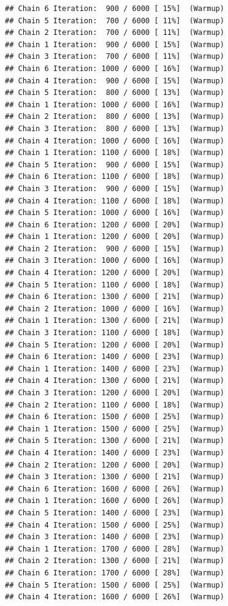 \documentclass[
]{article}
\begin{document}
\begin{verbatim}
## Chain 6 Iteration:  900 / 6000 [ 15%]  (Warmup) 
## Chain 5 Iteration:  700 / 6000 [ 11%]  (Warmup) 
## Chain 2 Iteration:  700 / 6000 [ 11%]  (Warmup) 
## Chain 1 Iteration:  900 / 6000 [ 15%]  (Warmup) 
## Chain 3 Iteration:  700 / 6000 [ 11%]  (Warmup) 
## Chain 6 Iteration: 1000 / 6000 [ 16%]  (Warmup) 
## Chain 4 Iteration:  900 / 6000 [ 15%]  (Warmup) 
## Chain 5 Iteration:  800 / 6000 [ 13%]  (Warmup) 
## Chain 1 Iteration: 1000 / 6000 [ 16%]  (Warmup) 
## Chain 2 Iteration:  800 / 6000 [ 13%]  (Warmup) 
## Chain 3 Iteration:  800 / 6000 [ 13%]  (Warmup) 
## Chain 4 Iteration: 1000 / 6000 [ 16%]  (Warmup) 
## Chain 1 Iteration: 1100 / 6000 [ 18%]  (Warmup) 
## Chain 5 Iteration:  900 / 6000 [ 15%]  (Warmup) 
## Chain 6 Iteration: 1100 / 6000 [ 18%]  (Warmup) 
## Chain 3 Iteration:  900 / 6000 [ 15%]  (Warmup) 
## Chain 4 Iteration: 1100 / 6000 [ 18%]  (Warmup) 
## Chain 5 Iteration: 1000 / 6000 [ 16%]  (Warmup) 
## Chain 6 Iteration: 1200 / 6000 [ 20%]  (Warmup) 
## Chain 1 Iteration: 1200 / 6000 [ 20%]  (Warmup) 
## Chain 2 Iteration:  900 / 6000 [ 15%]  (Warmup) 
## Chain 3 Iteration: 1000 / 6000 [ 16%]  (Warmup) 
## Chain 4 Iteration: 1200 / 6000 [ 20%]  (Warmup) 
## Chain 5 Iteration: 1100 / 6000 [ 18%]  (Warmup) 
## Chain 6 Iteration: 1300 / 6000 [ 21%]  (Warmup) 
## Chain 2 Iteration: 1000 / 6000 [ 16%]  (Warmup) 
## Chain 1 Iteration: 1300 / 6000 [ 21%]  (Warmup) 
## Chain 3 Iteration: 1100 / 6000 [ 18%]  (Warmup) 
## Chain 5 Iteration: 1200 / 6000 [ 20%]  (Warmup) 
## Chain 6 Iteration: 1400 / 6000 [ 23%]  (Warmup) 
## Chain 1 Iteration: 1400 / 6000 [ 23%]  (Warmup) 
## Chain 4 Iteration: 1300 / 6000 [ 21%]  (Warmup) 
## Chain 3 Iteration: 1200 / 6000 [ 20%]  (Warmup) 
## Chain 2 Iteration: 1100 / 6000 [ 18%]  (Warmup) 
## Chain 6 Iteration: 1500 / 6000 [ 25%]  (Warmup) 
## Chain 1 Iteration: 1500 / 6000 [ 25%]  (Warmup) 
## Chain 5 Iteration: 1300 / 6000 [ 21%]  (Warmup) 
## Chain 4 Iteration: 1400 / 6000 [ 23%]  (Warmup) 
## Chain 2 Iteration: 1200 / 6000 [ 20%]  (Warmup) 
## Chain 3 Iteration: 1300 / 6000 [ 21%]  (Warmup) 
## Chain 6 Iteration: 1600 / 6000 [ 26%]  (Warmup) 
## Chain 1 Iteration: 1600 / 6000 [ 26%]  (Warmup) 
## Chain 5 Iteration: 1400 / 6000 [ 23%]  (Warmup) 
## Chain 4 Iteration: 1500 / 6000 [ 25%]  (Warmup) 
## Chain 3 Iteration: 1400 / 6000 [ 23%]  (Warmup) 
## Chain 1 Iteration: 1700 / 6000 [ 28%]  (Warmup) 
## Chain 2 Iteration: 1300 / 6000 [ 21%]  (Warmup) 
## Chain 6 Iteration: 1700 / 6000 [ 28%]  (Warmup) 
## Chain 5 Iteration: 1500 / 6000 [ 25%]  (Warmup) 
## Chain 4 Iteration: 1600 / 6000 [ 26%]  (Warmup) 

\end{verbatim}
\end{document}
